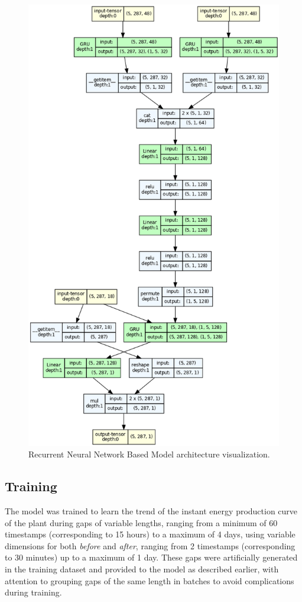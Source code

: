 \begin{figure}[H]
	\centering
	\includegraphics[height=.9\textheight]{chapters/3_models/imgs/grrun/grrunarchitecture.png}
	\caption{Recurrent Neural Network Based Model architecture visualization.}\label{fig:grrunarchitecture}
\end{figure}

\subsection{Training}
The model was trained to learn the trend of the instant energy production curve of the plant during gaps of variable lengths, ranging from a minimum of 60 timestamps (corresponding to 15 hours)
to a maximum of 4 days, using variable dimensions for both \textit{before} and \textit{after}, ranging from 2 timestamps (corresponding to 30 minutes) up to a maximum of 1 day.
These gaps were artificially generated in the training dataset and provided to the model
as described earlier, with attention to grouping gaps of the same length in
batches to avoid complications during training.

